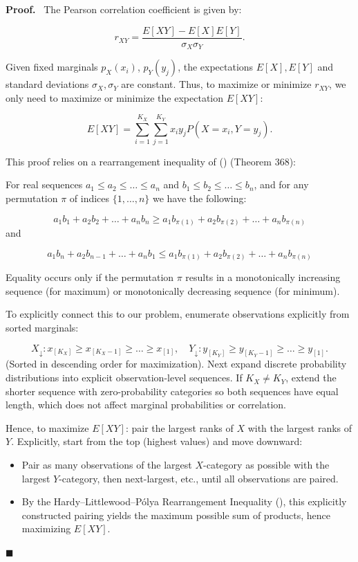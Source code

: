 \documentclass[
  12pt,
]{article}
\theoremstyle{plain}
\theoremstyle{definition}
\renewenvironment{proof}
   {\par\noindent\textbf{Proof.}\ }
   {\hfill$\blacksquare$\par}
\theoremstyle{remark}
\begin{document}
\begin{proof}
The Pearson correlation coefficient is given by:

\[r_{XY} = \frac{E[XY] - E[X]E[Y]}{\sigma_X \sigma_Y}.\]

Given fixed marginals \(p_X(x_i)\), \(p_Y(y_j)\), the expectations
\(E[X], E[Y]\) and standard deviations \(\sigma_X, \sigma_Y\) are
constant. Thus, to maximize or minimize \(r_{XY}\), we only need to
maximize or minimize the expectation \(E[XY]\):

\[E[XY] = \sum_{i=1}^{K_X}\sum_{j=1}^{K_Y} x_i y_j P(X = x_i, Y = y_j).\]

This proof relies on a rearrangement inequality of
() (Theorem 368):

For real sequences \(a_1 \leq a_2 \leq \dots \leq a_n\) and
\(b_1 \leq b_2 \leq \dots \leq b_n\), and for any permutation \(\pi\) of
indices \(\{1,\dots,n\}\) we have the following:

\[a_1 b_1 + a_2 b_2 + \dots + a_n b_n \geq a_1 b_{\pi(1)} + a_2 b_{\pi(2)} + \dots + a_n b_{\pi(n)}\]
and

\[a_1 b_n + a_2 b_{n-1} + \dots + a_n b_1 \leq a_1 b_{\pi(1)} + a_2 b_{\pi(2)} + \dots + a_n b_{\pi(n)}\]

Equality occurs only if the permutation \(\pi\) results in a
monotonically increasing sequence (for maximum) or monotonically
decreasing sequence (for minimum).

To explicitly connect this to our problem, enumerate observations
explicitly from sorted marginals:

\[
X_{\downarrow}: x_{[K_X]} \geq x_{[K_X-1]} \geq \dots \geq x_{[1]}, \quad  
        Y_{\downarrow}: y_{[K_Y]} \geq y_{[K_Y-1]} \geq \dots \geq y_{[1]}.
\] (Sorted in descending order for maximization). Next expand discrete
probability distributions into explicit observation-level sequences. If
\(K_X \neq K_Y\), extend the shorter sequence with zero-probability
categories so both sequences have equal length, which does not affect
marginal probabilities or correlation.

Hence, to maximize \(E[XY]\): pair the largest ranks of \(X\) with the
largest ranks of \(Y\). Explicitly, start from the top (highest values)
and move downward:

\begin{itemize}
\item
  Pair as many observations of the largest \(X\)-category as possible
  with the largest \(Y\)-category, then next-largest, etc., until all
  observations are paired.
\item
  By the Hardy--Littlewood--Pólya Rearrangement Inequality
  (), this
  explicitly constructed pairing yields the maximum possible sum of
  products, hence maximizing \(E[XY]\).
\end{itemize}


\end{proof}
\end{document}
